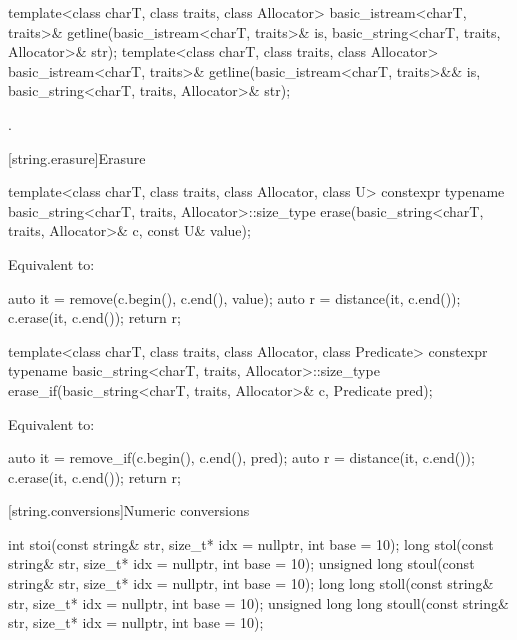 %
\begin{itemdecl}
template<class charT, class traits, class Allocator>
  basic_istream<charT, traits>&
    getline(basic_istream<charT, traits>& is,
            basic_string<charT, traits, Allocator>& str);
template<class charT, class traits, class Allocator>
  basic_istream<charT, traits>&
    getline(basic_istream<charT, traits>&& is,
            basic_string<charT, traits, Allocator>& str);
\end{itemdecl}

\begin{itemdescr}
\pnum
\returns
{}.
\end{itemdescr}

[string.erasure]{Erasure}

%
\begin{itemdecl}
template<class charT, class traits, class Allocator, class U>
  constexpr typename basic_string<charT, traits, Allocator>::size_type
    erase(basic_string<charT, traits, Allocator>& c, const U& value);
\end{itemdecl}

\begin{itemdescr}
\pnum
\effects
Equivalent to:
\begin{codeblock}
auto it = remove(c.begin(), c.end(), value);
auto r = distance(it, c.end());
c.erase(it, c.end());
return r;
\end{codeblock}
\end{itemdescr}

%
\begin{itemdecl}
template<class charT, class traits, class Allocator, class Predicate>
  constexpr typename basic_string<charT, traits, Allocator>::size_type
    erase_if(basic_string<charT, traits, Allocator>& c, Predicate pred);
\end{itemdecl}

\begin{itemdescr}
\pnum
\effects
Equivalent to:
\begin{codeblock}
auto it = remove_if(c.begin(), c.end(), pred);
auto r = distance(it, c.end());
c.erase(it, c.end());
return r;
\end{codeblock}
\end{itemdescr}

[string.conversions]{Numeric conversions}

%
%
%
%
%
\begin{itemdecl}
int stoi(const string& str, size_t* idx = nullptr, int base = 10);
long stol(const string& str, size_t* idx = nullptr, int base = 10);
unsigned long stoul(const string& str, size_t* idx = nullptr, int base = 10);
long long stoll(const string& str, size_t* idx = nullptr, int base = 10);
unsigned long long stoull(const string& str, size_t* idx = nullptr, int base = 10);
\end{itemdecl}

